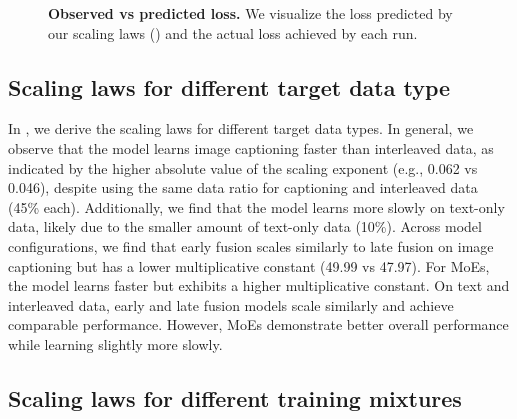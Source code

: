 \begin{figure}[h!]
    \centering
    \captionsetup{type=figure}
    \begin{subfigure}[t]{0.32\linewidth}
        
    \end{subfigure}
    \hfill
    \begin{subfigure}[t]{0.32\linewidth}
        
    \end{subfigure}
    \hfill
    \begin{subfigure}[t]{0.32\linewidth}
        
    \end{subfigure}
    \caption{\textbf{Observed vs predicted loss.} We visualize the loss predicted by our scaling laws () and the actual loss achieved by each run.}
    \label{fig:observed_vs_predicted_loss}
\end{figure}



\subsection{Scaling laws for different target data type}
In , we derive the scaling laws for different target data types. In general, we observe that the model learns image captioning faster than interleaved data, as indicated by the higher absolute value of the scaling exponent (e.g., 0.062 vs 0.046), despite using the same data ratio for captioning and interleaved data (45\% each). Additionally, we find that the model learns more slowly on text-only data, likely due to the smaller amount of text-only data (10\%). Across model configurations, we find that early fusion scales similarly to late fusion on image captioning but has a lower multiplicative constant (49.99 vs 47.97). For MoEs, the model learns faster but exhibits a higher multiplicative constant. On text and interleaved data, early and late fusion models scale similarly and achieve comparable performance. However, MoEs demonstrate better overall performance while learning slightly more slowly.






\subsection{Scaling laws for different training mixtures}

